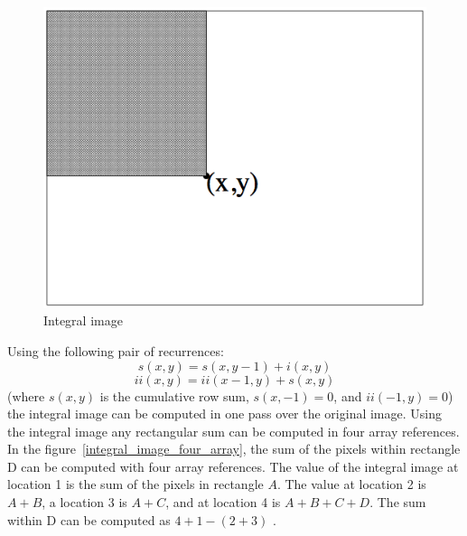 \begin{figure}[!h]
\begin{center}
\noindent \includegraphics[scale=0.6]{figures/integral_image_description} 
\newline
\caption{Integral image}
\label{integral_image_description}
\end{center} 
\end{figure}
	
\noindent Using the following pair of recurrences: 
\begin{equation}
s(x,y) = s(x,y - 1) + i(x,y)
\end{equation}
\begin{equation}
ii(x,y) = ii(x - 1,y) + s(x,y)
\end{equation}
(where $ s(x,y) $ is the cumulative row sum, $ s(x,-1) = 0 $, and $ ii(-1,y) = 0 $) the integral image can be computed in one pass over the original image. Using the integral image any rectangular sum can be computed in four array references. In the figure~\ref{integral_image_four_array}, the sum of the pixels within rectangle D can be computed with four array references. The value of the integral image at location 1 is the sum of the pixels in rectangle $ A $. The value at location 2 is $ A + B $, a location 3 is $ A + C $, and at location 4 is $ A + B + C + D $. The sum within D can be computed as $ 4 + 1 - (2 + 3) $ \cite{VIO01}. 
\newline

